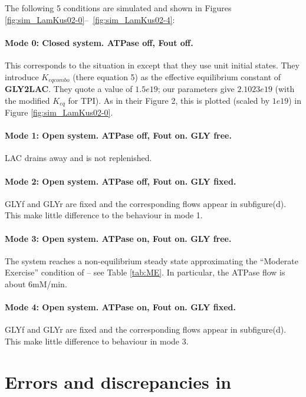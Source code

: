 \message{ !name(LamKus02_report.tex)}\documentclass[12pt,a4paper]{article}
\begin{document}
The following 5 conditions are simulated and shown in Figures
\ref{fig:sim_LamKus02-0}--~\ref{fig:sim_LamKus02-4}:

  \paragraph{Mode 0: Closed system. ATPase off, Fout off.}
  This corresponds to the situation in \citet[Figure 2]{LamKus02}
  except that they use unit initial states. They introduce
  $K_{eqcombo}$ (there equation 5) as the effective equilibrium constant of
  \textbf{GLY2LAC}. They quote a value of $1.5e19$; our parameters
  give $2.1023e19$ (with the modified $K_{eq}$ for TPI). As in their
  Figure 2, this is plotted (scaled by $1e19$) in Figure \ref{fig:sim_LamKus02-0}.
 

  \paragraph{Mode 1: Open system. ATPase off, Fout on. GLY free.}
  LAC drains away and is not replenished.
  \paragraph{Mode 2: Open system. ATPase off, Fout on. GLY fixed.}
  GLYf and GLYr are fixed and the corresponding flows appear in
  subfigure(d). This make little difference to the behaviour in mode 1.
  \paragraph{Mode 3: Open system. ATPase on, Fout on. GLY free.}
  The system reaches a non-equilibrium steady state approximating the
  ``Moderate Exercise'' condition of \citet[Table 4]{LamKus02} -- see
  Table \ref{tab:ME}. In particular, the ATPase flow is about 6mM/min.
  \paragraph{Mode 4: Open system. ATPase on, Fout on. GLY fixed.}
  GLYf and GLYr are fixed and the corresponding flows appear in
  subfigure(d). This make little difference to behaviour in mode 3.
\appendix
\section{Errors and discrepancies in \citet{LamKus02}}
\label{sec:errors-citelamkus02}
\end{document}
